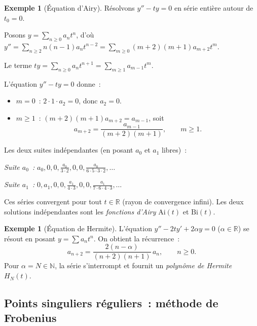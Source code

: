 \documentclass[12pt,a4paper,openany]{book}
\theoremstyle{definition}
\newtheorem{exemple}[definition]{Exemple}
\theoremstyle{plain}
\theoremstyle{remark}
\newcommand{\R}{\mathbb{R}}
\newcommand{\N}{\mathbb{N}}
\begin{document}
\begin{exemple}[Équation d'Airy]\label{ex:airy}
  Résolvons $y'' - ty = 0$ en série entière autour de $t_0 = 0$.

  Posons $y = \sum_{n \geq 0} a_n t^n$, d'où
  $y'' = \sum_{n \geq 2} n(n-1)a_n t^{n-2} = \sum_{m \geq 0}(m+2)(m+1)a_{m+2}t^m$.

  Le terme $ty = \sum_{n \geq 0} a_n t^{n+1} = \sum_{m \geq 1} a_{m-1}t^m$.

  L'équation $y'' - ty = 0$ donne~:
  \begin{itemize}
    \item $m = 0$~: $2 \cdot 1 \cdot a_2 = 0$, donc $a_2 = 0$.
    \item $m \geq 1$~: $(m+2)(m+1)a_{m+2} = a_{m-1}$, soit
      \begin{equation}\label{eq:recurrence-airy}
        a_{m+2} = \frac{a_{m-1}}{(m+2)(m+1)}, \qquad m \geq 1.
      \end{equation}
  \end{itemize}

  Les deux suites indépendantes (en posant $a_0$ et $a_1$ libres)~:

  \emph{Suite $a_0$~:} $a_0, 0, 0, \frac{a_0}{3\cdot 2},
  0, 0, \frac{a_0}{6\cdot 5\cdot 3\cdot 2}, \ldots$

  \emph{Suite $a_1$~:} $0, a_1, 0, 0, \frac{a_1}{4\cdot 3},
  0, 0, \frac{a_1}{7\cdot 6\cdot 4\cdot 3}, \ldots$

  Ces séries convergent pour tout $t \in \R$ (rayon de convergence
  infini). Les deux solutions indépendantes sont les \emph{fonctions
  d'Airy} $\mathrm{Ai}(t)$ et $\mathrm{Bi}(t)$.
\end{exemple}

\begin{exemple}[Équation de Hermite]\label{ex:hermite}
  L'équation $y'' - 2ty' + 2\alpha y = 0$ ($\alpha \in \R$) se résout
  en posant $y = \sum a_n t^n$. On obtient la récurrence~:
  \[
    a_{n+2} = \frac{2(n - \alpha)}{(n+2)(n+1)}\,a_n, \qquad n \geq 0.
  \]
  Pour $\alpha = N \in \N$, la série s'interrompt et fournit un
  \emph{polynôme de Hermite}~$H_N(t)$.
\end{exemple}

\subsection{Points singuliers réguliers~: méthode de Frobenius}\label{subsec:frobenius}
\end{document}
